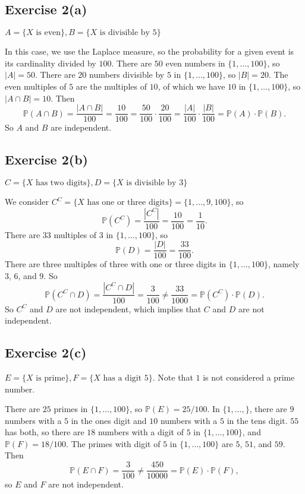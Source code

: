\documentclass[12pt]{article}
\newenvironment{problem}
    {\begin{lrbox}{\mybox}\begin{minipage}{\textwidth-10pt}}
    {\end{minipage}\end{lrbox}\framebox[\textwidth]{\usebox{\mybox}}}
\renewcommand{\P}{\mathbb{P}}
\begin{document}
\subsection*{Exercise 2(a)}
\begin{problem}
    $A=\{\text{$X$ is even}\}, B = \{\text{$X$ is divisible by $5$}\}$
\end{problem}
\medskip

In this case, we use the Laplace measure, so the probability for a given event is its cardinality divided by $100$. There are $50$ even numbers in $\{1,\dots,100\}$, so $|A|=50$. There are $20$ numbers divisible by $5$ in $\{1,\dots,100\}$, so $|B| = 20$. The even multiples of $5$ are the multiples of $10$, of which we have $10$ in $\{1,\dots,100\}$, so $|A\cap B|=10$. Then
\[\P(A\cap B) = \frac{|A\cap B|}{100} = \frac{10}{100} = \frac{50}{100}\cdot\frac{20}{100} = \frac{|A|}{100}\cdot \frac{|B|}{100} = \P(A) \cdot \P(B).\]
So $A$ and $B$ are independent.

\subsection*{Exercise 2(b)}
\begin{problem}
    $C=\{\text{$X$ has two digits}\}, D = \{\text{$X$ is divisible by $3$}\}$
\end{problem}
\medskip

We consider $C^C=\{X \text{ has one or three digits}\} = \{1,\dots,9,100\}$, so
\[\P(C^C) = \frac{|C^C|}{100} = \frac{10}{100} = \frac1{10}.\]
There are $33$ multiples of $3$ in $\{1,\dots,100\}$, so
\[\P(D) = \frac{|D|}{100} = \frac{33}{100}.\]
There are three multiples of three with one or three digits in $\{1,\dots,100\}$, namely $3$, $6$, and $9$. So
\[\P(C^C\cap D) = \frac{|C^C\cap D|}{100} = \frac{3}{100} \ne \frac{33}{1000} = \P(C^C) \cdot \P(D).\]
So $C^C$ and $D$ are not independent, which implies that $C$ and $D$ are not independent.

\subsection*{Exercise 2(c)}
\begin{problem}
    $E=\{\text{$X$ is prime}\}, F = \{\text{$X$ has a digit $5$}\}$. Note that $1$ is not considered a prime number.
\end{problem}
\medskip

There are $25$ primes in $\{1,\dots,100\}$, so $\P(E) = 25/100$. In $\{1,\dots,\}$, there are $9$ numbers with a $5$ in the ones digit and $10$ numbers with a $5$ in the tens digit. $55$ has both, so there are $18$ numbers with a digit of $5$ in $\{1,\dots,100\}$, and $\P(F) = 18/100$. The primes with digit of $5$ in $\{1,\dots,100\}$ are $5$, $51$, and $59$. Then \[\P(E\cap F) = \frac3{100} \ne \frac{450}{10000} = \P(E)\cdot \P(F),\]
so $E$ and $F$ are not independent.
\end{document}
